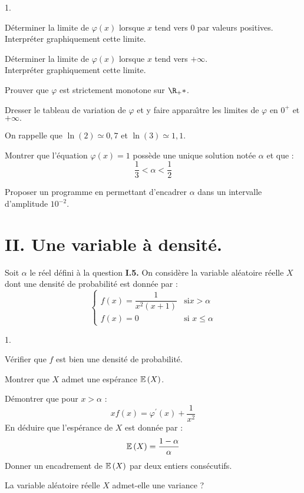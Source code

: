 \documentclass[11pt]{article}%
\begin{document}
\begin{noliste}{1.}
 \setlength{\itemsep}{4mm}
\item Déterminer la limite de $\varphi \left( x\right) $ lorsque $x$
tend vers $0$ par valeurs positives.\\
Interpréter graphiquement cette limite.

\item Déterminer la limite de $\varphi \left( x\right) $ lorsque $x$
tend vers $ + \infty $.\\
Interpréter graphiquement cette limite.

\item Prouver que $\varphi $ est strictement monotone sur $\R_{+}{\ast
}$.

\item Dresser le tableau de variation de $\varphi $ et y faire
appara\^{\i}tre les limites de $\varphi $ en $0^{+}$ et $ + \infty.$

\item On rappelle que $\ln \left( 2\right) \simeq 0,7$ et $\ln \left(
3\right) \simeq 1,1$.

Montrer que l'équation $\varphi \left( x\right) = 1$ possède une
unique solution notée $\alpha $ et que :
\[
\frac{1}{3}<\alpha <\frac{1}{2}
\]

\item Proposer un programme en \Scilab{} permettant d'encadrer $\alpha
$ dans
un intervalle d'amplitude $10^{-2}$.
\end{noliste}

\section*{II. Une variable à densité.}

Soit $\alpha $ le réel défini à la question \textbf{I.5.} On
considère la variable aléatoire réelle $X$ dont une densité
de probabilité est donnée par :
\[
\left\{
\begin{array}{ll}
f\left( x\right) = \dfrac{1}{x^{2}\left( x + 1\right) } & \text{si
}x>\alpha
\\
f\left( x\right) = 0 & \text{si }x\leq \alpha
\end{array}
\right.
\]

\begin{noliste}{1.}
 \setlength{\itemsep}{4mm}
\item Vérifier que $f$ est bien une densité de probabilité.

\item Montrer que $X$ admet une espérance $\mathbb{E}\left( X\right) $.

\item Démontrer que pour $x>\alpha $ :
\[
xf\left( x\right) = \varphi ^{\prime }\left( x\right) + \frac{1}{x^{2}}
\]
En déduire que l'espérance de $X$ est donnée par :
\[
\mathbb{E}\left( X\right) = \frac{1-\alpha }{\alpha }
\]
Donner un encadrement de $\mathbb{E}\left( X\right) $ par deux entiers
consécutifs.

\item La variable aléatoire réelle $X$ admet-elle une variance ?
\end{noliste}
\end{document}

